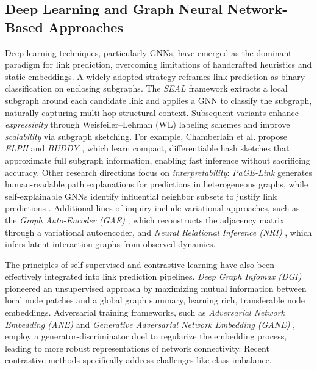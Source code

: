 \documentclass[pdflatex,sn-mathphys-num]{sn-jnl}%
\theoremstyle{thmstyleone}%
\theoremstyle{thmstyletwo}%
\theoremstyle{thmstylethree}%
\theoremstyle{plain} %
\theoremstyle{definition} %
\theoremstyle{remark} %
\theoremstyle{plain} %
\begin{document}
\subsection{Deep Learning and Graph Neural Network-Based Approaches}
Deep learning techniques, particularly GNNs, have emerged as the dominant paradigm for link prediction, overcoming limitations of handcrafted heuristics and static embeddings. 
A widely adopted strategy reframes link prediction as binary classification on enclosing subgraphs. 
The \textit{SEAL} framework \cite{14zhang2018link} extracts a local subgraph around each candidate link and applies a GNN to classify the subgraph, naturally capturing multi-hop structural context. Subsequent variants enhance \textit{expressivity} through Weisfeiler–Lehman (WL) labeling schemes \cite{32zhang2017weisfeiler} and improve \textit{scalability} via subgraph sketching. 
For example, Chamberlain et al. propose \textit{ELPH} and \textit{BUDDY} \cite{chamberlain2023elph}, which learn compact, differentiable hash sketches that approximate full subgraph information, enabling fast inference without sacrificing accuracy. Other research directions focus on \textit{interpretability}: \textit{PaGE-Link} \cite{Zhang2023PaGE} generates human-readable path explanations for predictions in heterogeneous graphs, while self-explainable GNNs identify influential neighbor subsets to justify link predictions \cite{Zhu2023SelfExplainable}. Additional lines of inquiry include variational approaches, such as the \textit{Graph Auto-Encoder (GAE)} \cite{31kipf2016variational}, which reconstructs the adjacency matrix through a variational autoencoder, and \textit{Neural Relational Inference (NRI)} \cite{41kipf2018neural}, which infers latent interaction graphs from observed dynamics.

The principles of self-supervised and contrastive learning have also been effectively integrated into link prediction pipelines. 
\textit{Deep Graph Infomax (DGI)} \cite{velickovic2018deep} pioneered an unsupervised approach by maximizing mutual information between local node patches and a global graph summary, learning rich, transferable node embeddings. 
Adversarial training frameworks, such as \textit{Adversarial Network Embedding (ANE)} \cite{dai2017adversarial} and \textit{Generative Adversarial Network Embedding (GANE)} \cite{hong2020gane}, employ a generator-discriminator duel to regularize the embedding process, leading to more robust representations of network connectivity. Recent contrastive methods specifically address challenges like class imbalance. 
\end{document}
